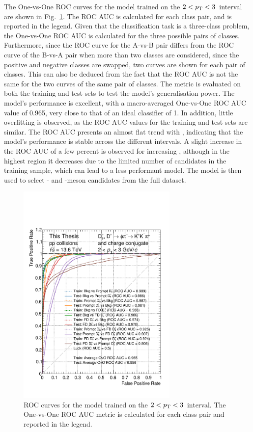 The One-vs-One ROC curves for the model trained on the $2<p_\mathrm{T}<3$~\gevc interval are shown in Fig.~\ref{fig:ml_roc_curve}. The ROC AUC is calculated for each class pair, and is reported in the legend. Given that the classification task is a three-class problem, the One-vs-One ROC AUC is calculated for the three possible pairs of classes. Furthermore, since the ROC curve for the A-vs-B pair differs from the ROC curve of the B-vs-A pair when more than two classes are considered, since the positive and negative classes are swapped, two curves are shown for each pair of classes. This can also be deduced from the fact that the ROC AUC is not the same for the two curves of the same pair of classes. The metric is evaluated on both the training and test sets to test the model's generalisation power. The model's performance is excellent, with a macro-averaged One-vs-One ROC AUC value of 0.965, very close to that of an ideal classifier of 1. In addition, little overfitting is observed, as the ROC AUC values for the training and test sets are similar. The ROC AUC presents an almost flat trend with \pt, indicating that the model's performance is stable across the different \pt intervals. A slight increase in the ROC AUC of a few percent is observed for increasing \pt, although in the highest \pt region it decreases due to the limited number of candidates in the training sample, which can lead to a less performant model. The model is then used to select \ds- and \dpl-meson candidates from the full dataset. 

\begin{figure}[htb]
    \centering
    \includegraphics[width=0.7\textwidth]{Figures/Chapter 5/ROC.pdf}
    \caption{ROC curves for the model trained on the $2<p_\mathrm{T}<3$~\gevc interval. The One-vs-One ROC AUC metric is calculated for each class pair and reported in the legend.}
    \label{fig:ml_roc_curve}
\end{figure}

